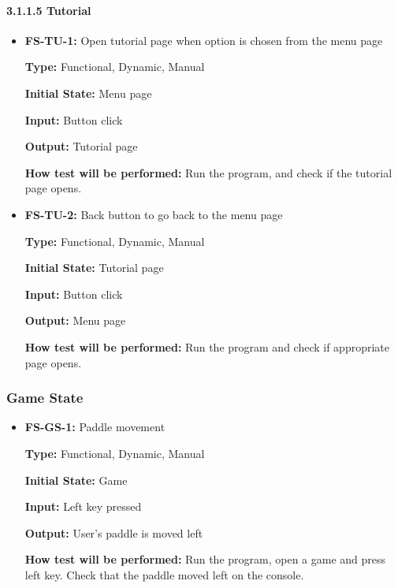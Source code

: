 \documentclass[12pt,letterpaper]{article}
\begin{document}
	\paragraph{3.1.1.5 Tutorial}
\begin{reqbox}
	\begin{itemize}
	\item\textbf{ FS-TU-1:} Open tutorial page when option is chosen from the menu page

	\textbf{Type: }Functional, Dynamic, Manual

	\textbf{Initial State: }Menu page

	\textbf{Input: }Button click 

	\textbf{Output: }Tutorial page

	\textbf{How test will be performed: }Run the program, and check if the tutorial page opens.
	\end{itemize}
\end{reqbox}

\begin{reqbox}
	\begin{itemize}
	\item \textbf{FS-TU-2: }Back button to go back to the menu page

	\textbf{Type: }Functional, Dynamic, Manual

	\textbf{Initial State: }Tutorial page	

	\textbf{Input: }Button click

	\textbf{Output: }Menu page

	\textbf{How test will be performed: }Run the program and check if appropriate page opens.
	\end{itemize}
\end{reqbox}

	\subsubsection{Game State}
\begin{reqbox}
	\begin{itemize}
	\item \textbf{FS-GS-1: }Paddle movement

	\textbf{Type: }Functional, Dynamic, Manual

	\textbf{Initial State: }Game 

	\textbf{Input: }Left key pressed

	\textbf{Output: }User’s paddle is moved left

	\textbf{How test will be performed: }Run the program, open a game and press left key. Check that the paddle moved left on the console.
	\end{itemize}
\end{reqbox}
\end{document}
